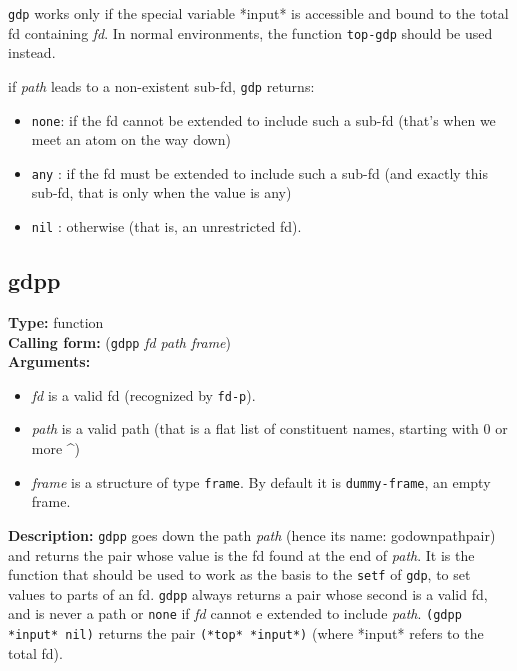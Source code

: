 \documentclass[10pt,a4paper]{report}
\begin{document}
{\tt gdp} works only if the special variable *input* is accessible
and bound to the total fd containing {\em fd}.  In normal environments, the
function {\tt top-gdp} should be used instead.

if {\em path} leads to a non-existent sub-fd, {\tt gdp} returns:
\begin{itemize}
\item {\tt none}: if the fd cannot be extended to include such a sub-fd
(that's when we meet an atom on the way down)

\item {\tt any} : if the fd must be extended to include such a sub-fd (and exactly
this sub-fd, that is only when the value is any)

\item {\tt nil} : otherwise (that is, an unrestricted fd).
\end{itemize}
 


\subsection{gdpp}
{\bf Type:} function
\\{\bf Calling form:} ({\tt gdpp} {\em fd path frame})
\\{\bf Arguments:}
\begin{itemize}
\item {\em fd} is a valid fd (recognized by {\tt fd-p}).

\item {\em path} is a valid path (that is a flat list of constituent
names, starting with 0 or more \^{})
 

\item {\em frame} is a structure of type {\tt frame}.  By default it is
{\tt dummy-frame}, an empty frame.
\end{itemize}
{\bf Description:} {\tt gdpp} goes down the path {\em path} (hence its
name: godownpathpair) and returns the pair whose value is the fd
found at the end of {\em path}. It is the function that should
be used to work as the basis to the {\tt setf} of {\tt gdp}, to set
values to parts of an fd. {\tt gdpp} always returns a pair whose
second is a valid fd, and is never a path or {\tt none} if {\em fd}
cannot e extended to include {\em path}. {\tt (gdpp *input* nil)}
returns the pair {\tt (*top* *input*)} (where *input* refers to the
total fd). 
\end{document}
